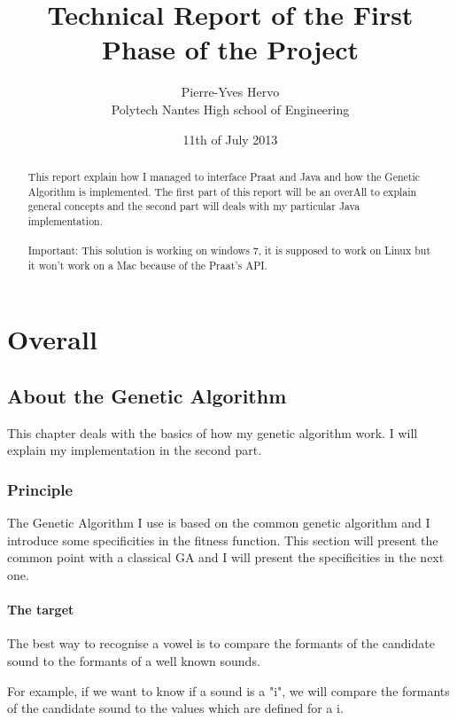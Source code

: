 \documentclass[12pt]{report}
\title{Technical Report of the First Phase of the Project}
\author{Pierre-Yves Hervo \\Polytech Nantes High school of Engineering }
\date{11th of July 2013}
\begin{document}
\maketitle

\begin{abstract}
This report explain how I managed to interface Praat and Java and how the Genetic Algorithm is implemented. The first part of this report will be an overAll to explain general concepts and the second part will deals with my particular Java implementation.

\paragraph*{}
Important: This solution is working on windows 7, it is supposed to work on Linux but it won't work on a Mac because of the Praat's API.

\end{abstract}

\tableofcontents

\part{Overall}

\chapter{About the Genetic Algorithm}
This chapter deals with the basics of how my genetic algorithm work. I will explain my implementation in the second part.

\section{Principle}
The Genetic Algorithm I use is based on the common genetic algorithm and I introduce some specificities in the fitness function. This section will present the common point with a classical GA and I will present the specificities in the next one.

\subsection{The target}
The best way to recognise a vowel is to compare the formants of the candidate sound to the formants of a well known sounds.

For example, if we want to know if a sound is a "i", we will compare the formants of the candidate sound to the values which are defined for a i.
\end{document}

